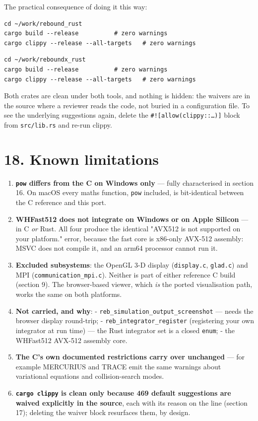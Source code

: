 \documentclass[11pt]{article}
\begin{document}
The practical consequence of doing it this way:

\begin{lstlisting}
cd ~/work/rebound_rust
cargo build --release          # zero warnings
cargo clippy --release --all-targets   # zero warnings
\end{lstlisting}

\begin{lstlisting}
cd ~/work/reboundx_rust
cargo build --release          # zero warnings
cargo clippy --release --all-targets   # zero warnings
\end{lstlisting}

Both crates are clean under both tools, and nothing is hidden: the waivers are in the source where a reviewer reads the code, not buried in a configuration file. To see the underlying suggestions again, delete the \texttt{\#![allow(clippy::\ldots{})]} block from \texttt{src/lib.rs} and re-run clippy.

\section{18. Known limitations}

\begin{enumerate}
\item \textbf{\texttt{pow} differs from the C on Windows only} --- fully characterised in section 16. On macOS every maths function, \texttt{pow} included, is bit-identical between the C reference and this port.
\item \textbf{WHFast512 does not integrate on Windows or on Apple Silicon} --- in C \emph{or} Rust. All four produce the identical "AVX512 is not supported on your platform." error, because the fast core is x86-only AVX-512 assembly: MSVC does not compile it, and an arm64 processor cannot run it.
\item \textbf{Excluded subsystems}: the OpenGL 3-D display (\texttt{display.c}, \texttt{glad.c}) and MPI (\texttt{communication\_mpi.c}). Neither is part of either reference C build (section 9). The browser-based viewer, which \emph{is} the ported visualisation path, works the same on both platforms.
\item \textbf{Not carried, and why}: - \texttt{reb\_simulation\_output\_screenshot} --- needs the browser display round-trip; - \texttt{reb\_integrator\_register} (registering your own integrator at run time) --- the Rust integrator set is a closed \texttt{enum}; - the WHFast512 AVX-512 assembly core.
\item \textbf{The C's own documented restrictions carry over unchanged} --- for example MERCURIUS and TRACE emit the same warnings about variational equations and collision-search modes.
\item \textbf{\texttt{cargo clippy} is clean only because 469 default suggestions are waived explicitly in the source}, each with its reason on the line (section 17); deleting the waiver block resurfaces them, by design.
\end{enumerate}
\end{document}
